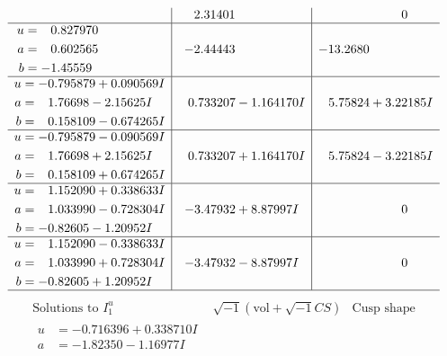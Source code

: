 \documentclass[1p]{elsarticle_modified}
\theoremstyle{definition}
\newcommand{\I}{\sqrt{-1}}
\begin{document}
$$\begin{array}{c|c|c}
 & \phantom{-}2.31401\phantom{ +0.000000I} & \phantom{-0.000000 } 0 \\ \hline\begin{aligned}
u &= \phantom{-}0.827970\phantom{ +0.000000I} \\
a &= \phantom{-}0.602565\phantom{ +0.000000I} \\
b &= -1.45559\phantom{ +0.000000I}\end{aligned}
 & -2.44443\phantom{ +0.000000I} & -13.2680\phantom{ +0.000000I} \\ \hline\begin{aligned}
u &= -0.795879 + 0.090569 I \\
a &= \phantom{-}1.76698 - 2.15625 I \\
b &= \phantom{-}0.158109 - 0.674265 I\end{aligned}
 & \phantom{-}0.733207 - 1.164170 I & \phantom{-}5.75824 + 3.22185 I \\ \hline\begin{aligned}
u &= -0.795879 - 0.090569 I \\
a &= \phantom{-}1.76698 + 2.15625 I \\
b &= \phantom{-}0.158109 + 0.674265 I\end{aligned}
 & \phantom{-}0.733207 + 1.164170 I & \phantom{-}5.75824 - 3.22185 I \\ \hline\begin{aligned}
u &= \phantom{-}1.152090 + 0.338633 I \\
a &= \phantom{-}1.033990 - 0.728304 I \\
b &= -0.82605 - 1.20952 I\end{aligned}
 & -3.47932 + 8.87997 I & \phantom{-0.000000 } 0 \\ \hline\begin{aligned}
u &= \phantom{-}1.152090 - 0.338633 I \\
a &= \phantom{-}1.033990 + 0.728304 I \\
b &= -0.82605 + 1.20952 I\end{aligned}
 & -3.47932 - 8.87997 I & \phantom{-0.000000 } 0\\
 \hline 
 \end{array}$$\newpage$$\begin{array}{c|c|c}  
\text{Solutions to }I^u_{1}& \I (\text{vol} + \sqrt{-1}CS) & \text{Cusp shape}\\
 \hline 
\begin{aligned}
u &= -0.716396 + 0.338710 I \\
a &= -1.82350 - 1.16977 I \\

\end{aligned}
\end{array}$$
\end{document}
